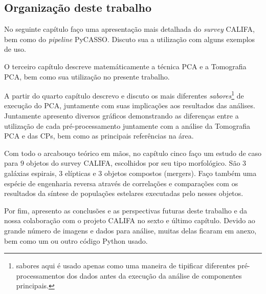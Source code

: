 \subsection{Organização deste trabalho}

No seguinte capítulo faço uma apresentação mais detalhada do {\em survey}
CALIFA, bem como do {\em pipeline} PyCASSO. Discuto sua a utilização com alguns
exemplos de uso.

O terceiro capítulo descreve matemáticamente a técnica PCA e a Tomografia PCA,
bem como sua utilização no presente trabalho. 

A partir do quarto capítulo descrevo e discuto os mais diferentes {\em
sabores}\footnote{sabores aqui é usado apenas como uma maneira de tipificar
diferentes pré-processamentos dos dados antes da execução da análise de
componentes principais.} de execução do PCA, juntamente com suas implicações aos
resultados das análises. Juntamente apresento diversos gráficos demonstrando as
diferenças entre a utilização de cada pré-processamento juntamente com a análise
da Tomografia PCA e das CPs, bem como as principais referências na área.

Com todo o arcabouço teórico em mãos, no capítulo cinco faço um estudo de caso
para $9$ objetos do survey CALIFA, escolhidos por seu tipo morfológico. São $3$
galáxias espirais, $3$ elípticas e $3$ objetos compostos (mergers). Faço também
uma espécie de engenharia reversa através de correlações e comparações com os
resultados da síntese de populações estelares executadas pelo \starlight nesses
objetos.

Por fim, apresento as conclusões e as perspectivas futuras deste trabalho e da
nossa colaboração com o projeto CALIFA no sexto e último capítulo. Devido ao
grande número de imagens e dados para análise, muitas delas ficaram em anexo,
bem como um ou outro código Python usado.

